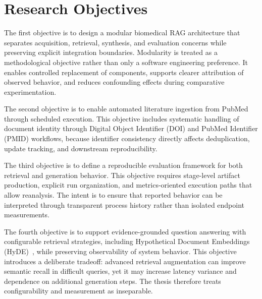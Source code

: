 \section{Research Objectives}

The first objective is to design a modular biomedical RAG architecture that separates acquisition, retrieval, synthesis, and evaluation concerns while preserving explicit integration boundaries. Modularity is treated as a methodological objective rather than only a software engineering preference. It enables controlled replacement of components, supports clearer attribution of observed behavior, and reduces confounding effects during comparative experimentation.

The second objective is to enable automated literature ingestion from PubMed through scheduled execution. This objective includes systematic handling of document identity through Digital Object Identifier (DOI) and PubMed Identifier (PMID) workflows, because identifier consistency directly affects deduplication, update tracking, and downstream reproducibility.

The third objective is to define a reproducible evaluation framework for both retrieval and generation behavior. This objective requires stage-level artifact production, explicit run organization, and metrics-oriented execution paths that allow reanalysis. The intent is to ensure that reported behavior can be interpreted through transparent process history rather than isolated endpoint measurements.

The fourth objective is to support evidence-grounded question answering with configurable retrieval strategies, including Hypothetical Document Embeddings (HyDE)~\cite{gao2023hyde}, while preserving observability of system behavior. This objective introduces a deliberate tradeoff: advanced retrieval augmentation can improve semantic recall in difficult queries, yet it may increase latency variance and dependence on additional generation steps. The thesis therefore treats configurability and measurement as inseparable.
